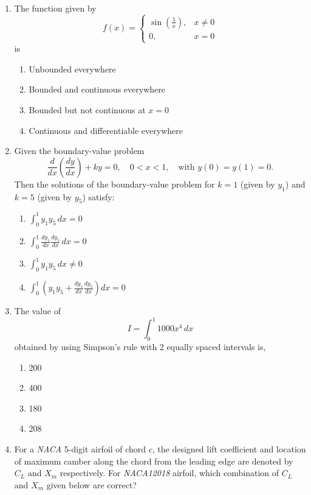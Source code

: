 \documentclass[journal]{IEEEtran}
\begin{document}
\begin{enumerate}
\item The function given by
\[
f(x) =
\begin{cases}
\sin\left(\frac{1}{x}\right), & x \neq 0 \\
0, & x = 0
\end{cases}
\]
is

\begin{enumerate}
    \item Unbounded everywhere
    \item Bounded and continuous everywhere
    \item Bounded but not continuous at \(x = 0\)
    \item Continuous and differentiable everywhere
\end{enumerate}
\hfill{}

\item Given the boundary-value problem
\[
\frac{d}{dx} \left( \frac{dy}{dx} \right) + k y = 0,\quad 0 < x < 1,\quad \text{with } y(0) = y(1) = 0.
\]
Then the solutions of the boundary-value problem for \( k = 1 \) (given by \( y_1 \)) and \( k = 5 \) (given by \( y_5 \)) satisfy:

\begin{enumerate}
    \item \(\displaystyle \int_0^1 y_1 y_5 \, dx = 0\)
    \item \(\displaystyle \int_0^1 \frac{dy_1}{dx} \frac{dy_5}{dx} \, dx = 0\)
    \item \(\displaystyle \int_0^1 y_1 y_5 \, dx \ne 0\)
    \item \(\displaystyle \int_0^1 \left( y_1 y_5 + \frac{dy_1}{dx} \frac{dy_5}{dx} \right) dx = 0\)
\end{enumerate}
\hfill{}

\item The value of
\[
I = \int_{0}^{1} 1000x^{4} \, dx
\]
obtained by using Simpson's rule with 2 equally spaced intervals is,

\begin{enumerate}
    \item 200
    \item 400
    \item 180
    \item 208
\end{enumerate}
\hfill{}

\item For a \textit{NACA} 5-digit airfoil of chord $c$, the designed lift coefficient and location of maximum camber along the chord from the leading edge are denoted by $C_L$ and $X_m$ respectively. For \textit{NACA12018} airfoil, which combination of $C_L$ and $X_m$ given below are correct?


\end{enumerate}
\end{document}
